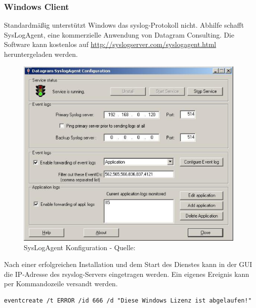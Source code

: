 \subsubsection{Windows Client}
Standardmäßig unterstützt Windows das syslog-Protokoll nicht. Abhilfe schafft SysLogAgent, eine kommerzielle Anwendung von Datagram Consulting. Die Software kann kostenlos auf \url{http://syslogserver.com/syslogagent.html} heruntergeladen werden.

\begin{figure}[h]
\begin{center}
 \includegraphics[width=\textwidth]{content/images/syslogagent.eps}
  \caption{SysLogAgent Konfiguration - Quelle: \cite{SysLogAgentScreendump}}
\end{center}
\end{figure}

Nach einer erfolgreichen Installation und dem Start des Dienstes kann in der GUI die IP-Adresse des rsyslog-Servers eingetragen werden. Ein eigenes Ereignis kann per Kommandozeile versandt werden.

\begin{lstlisting}
eventcreate /t ERROR /id 666 /d "Diese Windows Lizenz ist abgelaufen!"
\end{lstlisting}